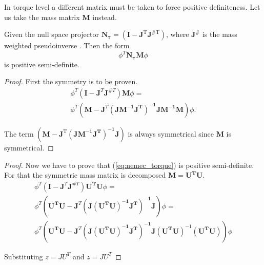  



In torque level a different matrix must be taken to force positive definiteness. Let us take the mass matrix  $\mathrm{\mathbf{M}}$ instead.




\begin{lemma}
	Given the null space projector   $\mathrm{\mathbf{N_{\tau}}} = \mathrm{(\mathbf{I} - \mathbf{J}^T \mathbf{J}^{\#T})}$, where $\mathrm{\mathbf{J}^{\#}}$ is the mass weighted pseudoinverse \cite{khatib1995}. Then the form
	\begin{equation}
	\phi^{T} \mathbf{N_{\tau}} \mathbf{M} \phi
	\label{eq:nemec_torque}
	\end{equation}  is positive semi-definite.
\end{lemma}

\begin{proof}
	First the symmetry is to be proven.
	\begin{equation}
	\begin{aligned}
	\phi^{T} (\mathbf{I} - \mathbf{J}^T \mathbf{J}^{\#T}) \mathbf{M} \phi = \\
	\phi^{T} (\mathbf{M} - \mathbf{J}^T 
	\mathbf{ (J M^{-1} J^{T})^{-1}	J  M^{-1}	}\mathbf{M} ) \phi .
	\end{aligned}	
	\end{equation}
	
	The term $\mathrm{(\mathbf{M} - \mathbf{J}^T \mathbf{ (J M^{-1} J^{T})^{-1}	J })}$ is always symmetrical since $\mathrm{\mathbf{M}}$ is symmetrical.
\end{proof}

\begin{proof}
	Now we have to prove that (\ref{eq:nemec_torque}) is positive semi-definite. For that the symmetric mass matrix is decomposed $\mathrm{\mathbf{M = U^{T} U}}$.
	\begin{equation}
	\begin{aligned}
	\phi^{T} (\mathbf{I} - \mathbf{J}^T \mathbf{J}^{\#T}) \mathbf{U^{T} U} \phi = \\
	\phi^{T} (\mathbf{U^{T} U} - \mathbf{J}^T 
	\mathbf{ (J (U^{T} U)^{-1} J^{T})^{-1}	J } )\phi = \\
	\phi^{T} (\mathbf{U^{T} U} - \mathbf{J}^T 
	\mathbf{ (J (U^{T} U)^{-1} J^{T})^{-1}	J } \mathbf{(U^{T} U)}^{-1}	\mathbf{(U^{T} U)}) \phi 
	\end{aligned}
	\end{equation}
	
	Substituting $z=J U^{T}$ and $z=J U^{T}$
	
	
\end{proof}
	


